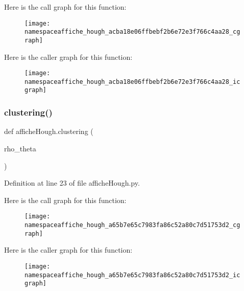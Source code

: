 Here is the call graph for this function\+:\nopagebreak
\begin{figure}[H]
\begin{center}
\leavevmode
\texttt{[image: namespaceaffiche\_hough\_acba18e06ffbebf2b6e72e3f766c4aa28\_cgraph]}
\end{center}
\end{figure}
Here is the caller graph for this function\+:\nopagebreak
\begin{figure}[H]
\begin{center}
\leavevmode
\texttt{[image: namespaceaffiche\_hough\_acba18e06ffbebf2b6e72e3f766c4aa28\_icgraph]}
\end{center}
\end{figure}
\mbox{\label{namespaceaffiche_hough_a65b7e65c7983fa86c52a80c7d51753d2}} 
\subsubsection{\texorpdfstring{clustering()}{clustering()}}
{\footnotesize\ttfamily def affiche\+Hough.\+clustering (\begin{DoxyParamCaption}\item[{}]{rho\+\_\+theta }\end{DoxyParamCaption})}



Definition at line 23 of file affiche\+Hough.\+py.

Here is the call graph for this function\+:\nopagebreak
\begin{figure}[H]
\begin{center}
\leavevmode
\texttt{[image: namespaceaffiche\_hough\_a65b7e65c7983fa86c52a80c7d51753d2\_cgraph]}
\end{center}
\end{figure}
Here is the caller graph for this function\+:\nopagebreak
\begin{figure}[H]
\begin{center}
\leavevmode
\texttt{[image: namespaceaffiche\_hough\_a65b7e65c7983fa86c52a80c7d51753d2\_icgraph]}
\end{center}
\end{figure}
\mbox{\label{namespaceaffiche_hough_aee6613c62eeeb117afce83cfa389b0bb}} 

